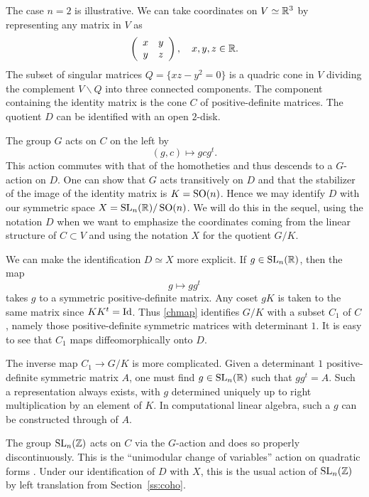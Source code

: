 \begin{example}
The case $n=2$ is illustrative.  We can take
coordinates on $V \simeq \mathbb{R}^{3}$ by representing any matrix in $V$ as 
\[
\left(\begin{array}{cc}
x&y\\
y&z
\end{array} \right), \quad x,y,z\in \mathbb{R}.  
\] 
The subset of singular matrices $Q = \{xz-y^{2}=0 \}$ is a quadric
cone in $V$ dividing the complement $V\smallsetminus Q$ into three
connected components.  The component containing the identity matrix is
the cone $C$ of positive-definite matrices. The quotient $D$ can be
identified with an open $2$-disk.
\end{example}

The group $G$ acts on $C$ on the left by
\[
(g,c)\longmapsto gcg^{t}.
\]
This action commutes with that of the homotheties and thus
descends to a $G$-action on $D$.  One can show that $G$ acts transitively
on $D$ and that the stabilizer of the image of the identity matrix is
$K=\operatorname{SO} (n)$.  Hence we may identify $D$ with our symmetric space $X =
\operatorname{SL}_{n} (\mathbb{R} )/\operatorname{SO} (n)$.  We will do this in the sequel, using the
notation $D$ when we want to emphasize the coordinates coming from the
linear structure of $C\subset V$ and using the notation $X$ for the
quotient $G/K$.

We can make the identification $D\simeq X$ more explicit.  If $g\in
\operatorname{SL}_{n} (\mathbb{R})$, then the map 
\begin{equation}\label{chmap}
g \longmapsto gg^{t}
\end{equation}
takes $g$ to a symmetric positive-definite matrix.  Any coset $gK$ is
taken to the same matrix since $KK^{t} = \operatorname{Id}$.  Thus \eqref{chmap}
identifies $G/K$ with a subset $C_{1}$ of $C$, namely those
positive-definite symmetric matrices with determinant $1$.  It is
easy to see that $C_{1}$ maps diffeomorphically onto $D$.  

The inverse map $C_{1}\rightarrow G/K$ is more complicated. Given a
determinant $1$ positive-definite symmetric matrix $A$, one must find
$g\in \operatorname{SL}_{n} (\mathbb{R})$ such that $gg^{t}=A$.  Such a representation
always exists, with $g$ determined uniquely up to right multiplication
by an element of $K$.  In computational linear algebra, such a $g$ can
be constructed through  of $A$.

The group $\operatorname{SL}_{n} (\mathbb{Z} )$ acts on $C$ via the $G$-action and does so
properly discontinuously.  This is the ``unimodular change of
variables'' action on quadratic forms \cite[V.1.1]{serre:arithmetic}.
Under our identification of $D$ with $X$, this is the usual action of
$\operatorname{SL}_{n} (\mathbb{Z})$ by left translation from Section~\ref{ss:coho}.

